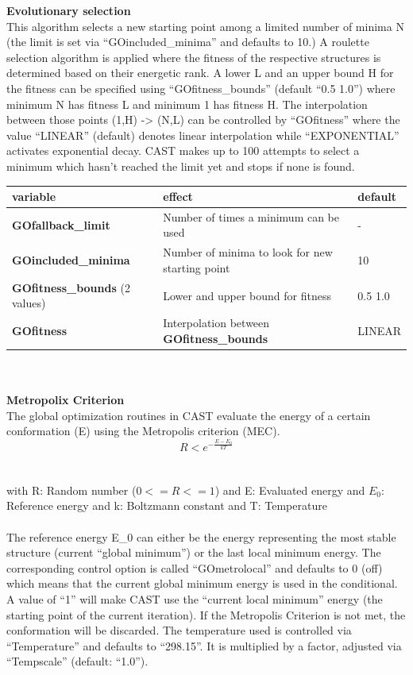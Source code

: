 \documentclass[10pt,a4paper]{article} %
\begin{document}
	\textbf{Evolutionary selection} \\
	This algorithm selects a new starting point among a limited number of minima N (the limit is set via ``GOincluded\_minima'' and defaults to 10.)
	A roulette selection algorithm is applied where the fitness of the respective structures is determined based on their energetic rank. A lower L and an upper bound H for the fitness can be specified using ``GOfitness\_bounds'' (default ``0.5 1.0'') where minimum N has fitness L and minimum 1 has fitness H.
	The interpolation between those points (1,H) -> (N,L) can be controlled by ``GOfitness'' where the value ``LINEAR'' (default) denotes linear interpolation while ``EXPONENTIAL'' activates exponential decay.
	\ac{CAST} makes up to 100 attempts to select a minimum which hasn't reached the limit yet and stops if none is found.
	
	\begin{tabularx}{\textwidth}{l|X|X}
	variable & effect & default \\
		\hline
		\textbf{GOfallback\_limit} & Number of times a minimum can be used & - \\
		\textbf{GOincluded\_minima} & Number of minima to look for new starting point & 10 \\
		\textbf{GOfitness\_bounds} (2 values) & Lower and upper bound for fitness & 0.5 1.0 \\
		\textbf{GOfitness} & Interpolation between \textbf{GOfitness\_bounds} & LINEAR \\
	\end{tabularx}
	\\~\\

	\textbf{Metropolix Criterion} \\
	The global optimization routines in \ac{CAST} evaluate the energy of a certain conformation (E) using the Metropolis criterion (MEC).
	\begin{equation}
	R < e^{-\frac{E-E_0}{kT}}
	\end{equation}
	\\~\\
	with R: Random number ($0 <= R <= 1$)
	and E: Evaluated energy
	and $E_0$: Reference energy
	and k: Boltzmann constant
	and T: Temperature\\~\\
	
	The reference energy E\_0 can either be the energy representing the most stable structure (current ``global minimum'') or the last local minimum energy. The corresponding control option is called ``GOmetrolocal'' and defaults to 0 (off) which means that the current global minimum energy is used in the conditional. A value of ``1'' will make \ac{CAST} use the ``current local minimum'' energy (the starting point of the current iteration). If the Metropolis Criterion is not met, the conformation will be discarded.
	The temperature used is controlled via ``Temperature'' and defaults to ``298.15''. It is multiplied by a factor, adjusted via ``Tempscale'' (default: ``1.0'').\\~\\
	
\end{document}
